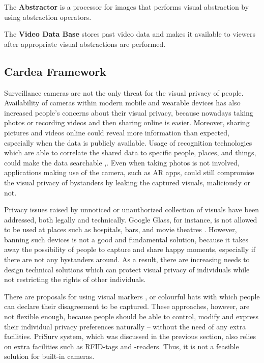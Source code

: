 \documentclass[conference]{IEEEtran}
\begin{document}
The \textbf{Abstractor} is a processor for images that performs visual abstraction by using abstraction operators. 

The \textbf{Video Data Base} stores past video data and makes it available to viewers after appropriate visual abstractions are performed. 

\subsection{Cardea Framework}

Surveillance cameras are not the only threat for the visual privacy of people. Availability of cameras within modern mobile and wearable devices has also increased people's concerns about their visual privacy, because nowadays taking photos or recording videos and then sharing online is easier. Moreover, sharing pictures and videos online could reveal more information than expected, especially when the data is publicly available. Usage of recognition technologies which are able to correlate the shared data to specific people, places, and things, could make the data searchable \cite{gross2014},\cite{shaw2006}. Even when taking photos is not involved, applications making use of the camera, such as \ac{AR} apps, could still compromise the visual privacy of bystanders by leaking the captured visuals, maliciously or not. 

Privacy issues raised by unnoticed or unauthorized collection of visuals have been addressed, both legally and technically. Google Glass, for instance, is not allowed to be used at places such as hospitals, bars, and movie theatres \cite{google2013glass}. However, banning such devices is not a good and fundamental solution, because it takes away the possibility of people to capture and share happy moments, especially if there are not any bystanders around. As a result, there are increasing needs to design technical solutions which can protect visual privacy of individuals while not restricting the rights of other individuals. 
	
There are proposals for using visual markers \cite{roesner2014},\cite{liu2014} or colourful hats \cite{sastry2007} with which people can declare their disagreement to be captured. These approaches, however, are not flexible enough, because people should be able to control, modify and express their individual privacy preferences naturally – without the need of any extra facilities. PriSurv system, which was discussed in the previous section, also relies on extra facilities such as \ac{RFID}-tags and -readers. Thus, it is not a feasible solution for built-in cameras. 
\end{document}
